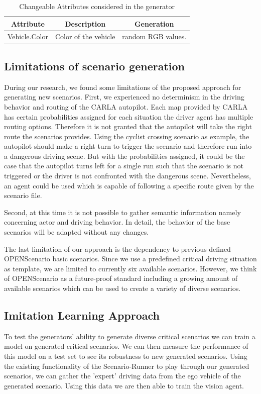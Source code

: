 \documentclass[conference, a4paper, 11pt]{IEEEtran}
\begin{document}
\begin{table}
	\renewcommand{\arraystretch}{1.3}
	\caption{Changeable Attributes considered in the generator}
	\label{attribute_table}
	\centering
	\begin{tabular}{c|c|c}
		\hline
		\bfseries Attribute & \bfseries Description & \bfseries Generation \\
		\hline\hline
		Vehicle.Color  & Color of the vehicle & random RGB values. \\
		\hline
	\end{tabular}
\end{table}
\subsection{Limitations of scenario generation}
During our research, we found some limitations of the proposed approach for generating new scenarios. First, we experienced no determinism in the driving behavior and routing of the CARLA autopilot. Each map provided by CARLA has certain probabilities assigned for each situation the driver agent has multiple routing options. Therefore it is not granted that the autopilot will take the right route the scenarios provides. Using the cyclist crossing scenario as example, the autopilot should make a right turn to trigger the scenario and therefore run into a dangerous driving scene. But with the probabilities assigned, it could be the case that the autopilot turns left for a single run such that the scenario is not triggered or the driver is not confronted with the dangerous scene. Nevertheless, an agent could be used which is capable of following a specific route given by the scenario file.

Second, at this time it is not possible to gather semantic information namely concerning actor and driving behavior. In detail, the behavior of the base scenarios will be adapted without any changes.  

The last limitation of our approach is the dependency to previous defined OPENScenario basic scenarios. Since we use a predefined critical driving situation as template, we are limited to currently six available scenarios. However, we think of OPENScenario as a future-proof standard including a growing amount of available scenarios which can be used to create a variety of diverse scenarios.

\subsection{Imitation Learning Approach}
To test the generators' ability to generate diverse critical scenarios we can train a model on generated critical scenarios. We can then measure the performance of this model on a test set to see its robustness to new generated scenarios. Using the existing functionality of the Scenario-Runner to play through our generated scenarios, we can gather the 'expert' driving data from the ego vehicle of the generated scenario. Using this data we are then able to train the vision agent.
\end{document}
